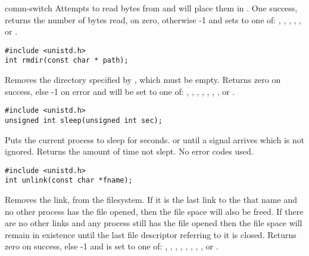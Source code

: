\begin{Ventry2}{comm-switch  }
Attempts to read  bytes from  and will place
them in . One success, returns the number of bytes read,
on  zero, otherwise -1 and sets  to one of:
, , , , , or 
.


\item[rmdir]
\label{item:rmdir}
\begin{production}
\begin{verbatim}
#include <unistd.h>
int rmdir(const char * path);
\end{verbatim}
\end{production}
 
Removes the directory specified by , which must be empty.
Returns zero on success, else -1 on error and
 will be set to one of: , ,
, , , ,
 ,  or .


\item[sleep]
\label{item:sleep}
\begin{production}
\begin{verbatim}
#include <unistd.h>
unsigned int sleep(unsigned int sec);
\end{verbatim}
\end{production}

Puts the current process to sleep for   seconds.
or until a signal arrives which is not ignored. Returns
the amount of time not slept. No error codes used.

\item[unlink]
\label{item:unlink}
\begin{production}
\begin{verbatim}
#include <unistd.h>
int unlink(const char *fname);
\end{verbatim}
\end{production}

Removes the link,  from the filesystem. If it is the last
link to the that name and no other process has the file opened, then
the file space will also be freed. If there are no other links and any
process still has the file opened then the file space will remain in
existence until the last file descriptor referring to it is
closed. Returns zero on success, else -1 and 
 is set to one of: , , , 
, , , ,  , or .




\end{Ventry2}

